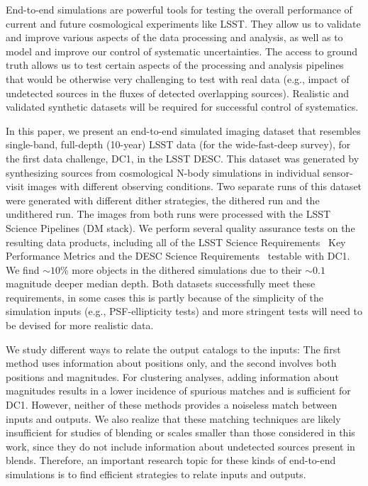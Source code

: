 \documentclass[\docopts]{\docclass}
\begin{document}
End-to-end simulations are powerful tools for testing the overall performance of current and future cosmological experiments like LSST. They allow us to validate and improve various aspects of the data processing and analysis, as well as to model and improve our control of systematic uncertainties. The access to ground truth allows us to test certain aspects of the processing and analysis pipelines that would be otherwise very challenging to test with real data (e.g., impact of undetected sources in the fluxes of detected overlapping sources). Realistic and validated synthetic datasets will be required for successful control of systematics.

In this paper, we present an end-to-end simulated imaging dataset that resembles single-band, full-depth (10-year) LSST data (for the wide-fast-deep survey), for the first data challenge, DC1, in the LSST DESC. This dataset was generated by synthesizing sources from cosmological N-body simulations in individual sensor-visit images with different observing conditions. Two separate runs of this dataset were generated with different dither strategies, the dithered run and the undithered run. The images from both runs were processed with the LSST Science Pipelines (DM stack). We perform several quality assurance tests on the resulting data products, including all of the LSST Science Requirements~\citep{LPM-17} Key Performance Metrics and the DESC Science Requirements~\citep{2018arXiv180901669T} testable with DC1. We find $\sim10$\% more objects in the dithered simulations due to their $\sim0.1$ magnitude deeper median depth. Both datasets successfully meet these requirements, in some cases this is partly because of the simplicity of the simulation inputs (e.g., PSF-ellipticity tests) and more stringent tests will need to be devised for more realistic data.

We study different ways to relate the output catalogs to the inputs: The first method uses information about positions only, and the second involves both positions and magnitudes. For clustering analyses, adding information about magnitudes results in a lower incidence of spurious matches and is sufficient for DC1. However, neither of these methods provides a noiseless match between inputs and outputs. We also realize that these matching techniques are likely insufficient for studies of blending or scales smaller than those considered in this work, since they do not include information about undetected sources present in blends. Therefore, an important research topic for these kinds of end-to-end simulations is to find efficient strategies to relate inputs and outputs. 
\end{document}
